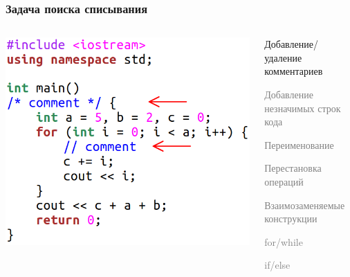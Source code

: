 \documentclass[10pt]{beamer}
\begin{document}
\begin{frame}[fragile]\frametitle{Задача поиска списывания}
	\centering
	\begin{columns}
		\centering
		\includegraphics[scale=0.7]{comment.png}
		
		\centering
		\begin{itemize}
			\item Добавление/удаление комментариев
			\textcolor{gray}{
				\item Добавление незначимых строк кода
			\item Переименование
			\item Перестановка операций
			\item Взаимозаменяемые конструкции
		}
			\begin{itemize}
				\item \textcolor{gray}{for/while
				\item if/else
			}
			\end{itemize}
		\end{itemize}
	\end{columns}
\end{frame}
\end{document}
